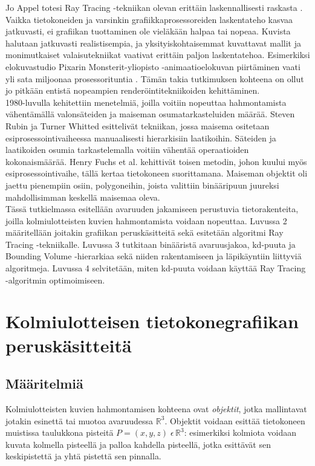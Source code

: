 \documentclass[a4paper,12pt, titlepage]{article}
\newcommand{\R}{\mathbb{R}}
\begin{document}
Jo Appel totesi Ray Tracing -tekniikan olevan erittäin laskennallisesti raskasta \citep{appel}. Vaikka tietokoneiden ja varsinkin grafiikkaprosessoreiden laskentateho kasvaa jatkuvasti, ei grafiikan tuottaminen ole vieläkään halpaa tai nopeaa. Kuvista halutaan jatkuvasti realistisempia, ja yksityiskohtaisemmat kuvattavat mallit ja monimutkaiset valaisutekniikat vaativat erittäin paljon laskentatehoa. Esimerkiksi elokuvastudio Pixarin Monsterit-yliopisto -animaatioelokuvan piirtäminen vaati yli sata miljoonaa prosessorituntia \citep{monsterit}. Tämän takia tutkimuksen kohteena on ollut jo pitkään entistä nopeampien renderöintitekniikoiden kehittäminen.\\

1980-luvulla kehitettiin menetelmiä, joilla voitiin nopeuttaa hahmontamista vähentämällä valonsäteiden ja maiseman osumatarkasteluiden määrää. Steven Rubin ja Turner Whitted esittelivät tekniikan, jossa maisema ositetaan esiprosessointivaiheessa manuaalisesti hierarkisiin laatikoihin. Säteiden ja laatikoiden osumia tarkastelemalla voitiin vähentää operaatioiden kokonaismäärää. \citep[.]{rubin} Henry Fuchs et al. kehittivät toisen metodin, johon kuului myös esiprosessointivaihe, tällä kertaa tietokoneen suorittamana. Maiseman objektit oli jaettu pienempiin osiin, polygoneihin, joista valittiin binääripuun juureksi mahdollisimman keskellä maisemaa oleva.\\

Tässä tutkielmassa esitellään avaruuden jakamiseen perustuvia tietorakenteita, joilla kolmiulotteisten kuvien hahmontamista voidaan nopeuttaa. Luvussa 2 määritellään joitakin grafiikan peruskäsitteitä sekä esitetään algoritmi Ray Tracing -tekniikalle. Luvussa 3 tutkitaan binääristä avaruusjakoa, kd-puuta ja Bounding Volume -hierarkiaa sekä niiden rakentamiseen ja läpikäyntiin liittyviä algoritmeja. Luvussa 4 selvitetään, miten kd-puuta voidaan käyttää Ray Tracing -algoritmin optimoimiseen.


\newpage
\section{Kolmiulotteisen tietokonegrafiikan peruskäsitteitä}
\subsection{Määritelmiä}

Kolmiulotteisten kuvien hahmontamisen kohteena ovat \emph{objektit}, jotka mallintavat jotakin esinettä tai muotoa avaruudessa $\R^3$. Objektit voidaan esittää tietokoneen muistissa taulukkona pisteitä $P=(x,y,z)\;\epsilon\,\R^3$: esimerkiksi kolmiota voidaan kuvata kolmella pisteellä ja palloa kahdella pisteellä, jotka esittävät sen keskipistettä ja yhtä pistettä sen pinnalla. \citep[.]{angel}\\
\end{document}
